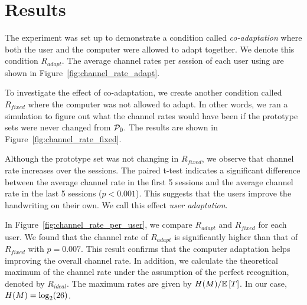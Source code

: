 \documentclass{sigchi}
\begin{document}
\section{Results}
\label{sec:results}

The experiment was set up to demonstrate a condition called {\em
  co-adaptation} where both the user and the computer were allowed to
adapt together. We denote this condition $R_{adapt}$. The average
channel rates per session of each user using are shown in
Figure~\ref{fig:channel_rate_adapt}. 

To investigate the effect of co-adaptation, we create another
condition called $R_{fixed}$ where the computer was not allowed to
adapt. In other words, we ran a simulation to figure out what the
channel rates would have been if the prototype sets were never changed
from $\mathcal{P}_0$. The results are shown in
Figure~\ref{fig:channel_rate_fixed}.

Although the prototype set was not changing in $R_{fixed}$, we observe
that channel rate increases over the sessions. The paired t-test
indicates a significant difference between the average channel rate in
the first 5 sessions and the average channel rate in the last 5
sessions ($p < 0.001$). This suggests that the users improve the
handwriting on their own. We call this effect {\em user
  adaptation}. 

In Figure~\ref{fig:channel_rate_per_user}, we compare $R_{adapt}$ and
$R_{fixed}$ for each user. We found that the channel rate of
$R_{adapt}$ is significantly higher than that of $R_{fixed}$ with $p = 0.007$.
This result confirms that the computer adaptation helps improving the
overall channel rate. In addition, we calculate the theoretical
maximum of the channel rate under the assumption of the perfect
recognition, denoted by $R_{ideal}$. The maximum rates are given by
$H(M) / \mathbb{E} \left[T\right]$. In our case, $H(M) =
\log_2(26)$. 
\end{document}
